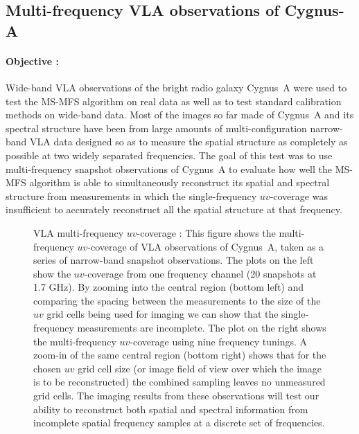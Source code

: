 \documentclass[structabstract]{stylefiles/aa}
\renewcommand{\cite}{\citep}
\begin{document}
\subsection{Multi-frequency VLA observations of Cygnus-A}

\paragraph{Objective : }
Wide-band VLA observations of the bright radio galaxy Cygnus~A were used to
test the MS-MFS algorithm on real data as well as to test standard
calibration methods on wide-band data.
Most of the images so far made of Cygnus~A and
its spectral structure have been from large amounts of multi-configuration
narrow-band VLA data \cite{CYGA_1991} designed so as to measure the spatial structure as
completely as possible at two widely separated frequencies.
The goal of this test was to use multi-frequency
snapshot observations of Cygnus~A to evaluate how well the MS-MFS algorithm is 
able to simultaneously reconstruct its spatial and spectral structure
from measurements in which the single-frequency $uv$-coverage was insufficient
to accurately reconstruct all the spatial structure at that frequency.


\begin{figure}[t!]
\caption[VLA multi-frequency $uv$-coverage]
{\small VLA multi-frequency $uv$-coverage : 
	This figure shows the multi-frequency $uv$-coverage of VLA observations of Cygnus~A,
taken as a series of narrow-band snapshot observations. The plots on the left show the
$uv$-coverage from one frequency channel (20 snapshots at 1.7 GHz).
By zooming into the central region (bottom left) and comparing the spacing between the
measurements to the size of the $uv$ grid cells being used for imaging we can show that
the single-frequency measurements are incomplete. 
The plot on the right shows the multi-frequency $uv$-coverage using nine frequency tunings.
A zoom-in of the same central region (bottom right) shows that for the chosen $uv$ grid cell
size (or image field of view over which the image is to be reconstructed) the combined
sampling leaves no unmeasured grid cells. The imaging results from these observations will
test our ability to reconstruct both spatial and spectral information from
incomplete spatial frequency samples at a discrete set of frequencies.}
\label{Fig:cyga_uvcoverage}
\end{figure}
\end{document}
